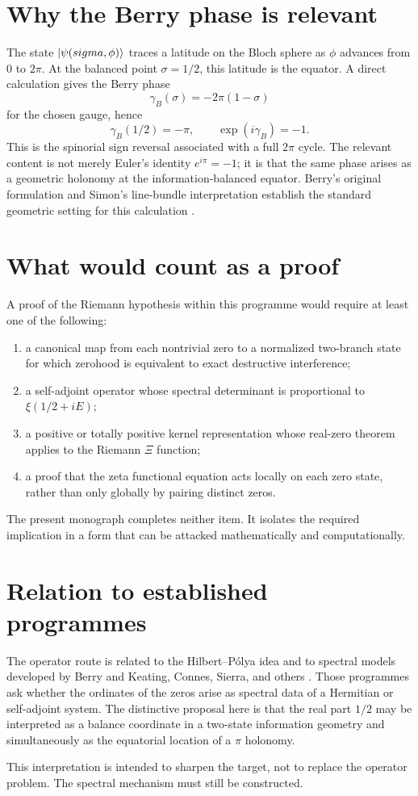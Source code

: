 \section{Why the Berry phase is relevant}
The state $\lvert \psi(sigma,\phi)\rangle$ traces a latitude on the Bloch sphere as $\phi$ advances from $0$ to $2\pi$. At the balanced point $\sigma=1/2$, this latitude is the equator. A direct calculation gives the Berry phase
\begin{equation}
\gamma_B(\sigma)=-2\pi(1-\sigma)
\end{equation}
for the chosen gauge, hence
\begin{equation}
\gamma_B(1/2)=-\pi,
\qquad
\exp(i\gamma_B)=-1.
\end{equation}
This is the spinorial sign reversal associated with a full $2\pi$ cycle. The relevant content is not merely Euler's identity $e^{i\pi}=-1$; it is that the same phase arises as a geometric holonomy at the information-balanced equator. Berry's original formulation and Simon's line-bundle interpretation establish the standard geometric setting for this calculation \cite{Berry1984,Simon1983}.

\section{What would count as a proof}
A proof of the Riemann hypothesis within this programme would require at least one of the following:
\begin{enumerate}
\item a canonical map from each nontrivial zero to a normalized two-branch state for which zerohood is equivalent to exact destructive interference;
\item a self-adjoint operator whose spectral determinant is proportional to $\xi(1/2+iE)$;
\item a positive or totally positive kernel representation whose real-zero theorem applies to the Riemann $\Xi$ function;
\item a proof that the zeta functional equation acts locally on each zero state, rather than only globally by pairing distinct zeros.
\end{enumerate}
The present monograph completes neither item. It isolates the required implication in a form that can be attacked mathematically and computationally.

\section{Relation to established programmes}
The operator route is related to the Hilbert--Pólya idea and to spectral models developed by Berry and Keating, Connes, Sierra, and others \cite{BerryKeating1999,Connes1999,Sierra2007}. Those programmes ask whether the ordinates of the zeros arise as spectral data of a Hermitian or self-adjoint system. The distinctive proposal here is that the real part $1/2$ may be interpreted as a balance coordinate in a two-state information geometry and simultaneously as the equatorial location of a $\pi$ holonomy.

This interpretation is intended to sharpen the target, not to replace the operator problem. The spectral mechanism must still be constructed.
